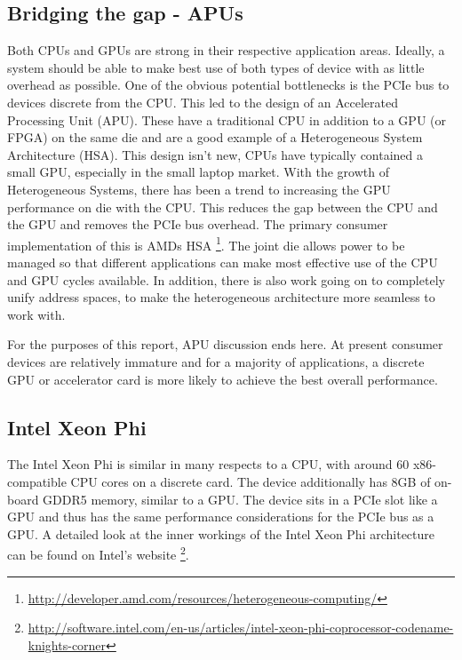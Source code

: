 \subsection{Bridging the gap - APUs}

Both CPUs and GPUs are strong in their respective application areas. Ideally, a
system should be able to make best use of both types of device with as little
overhead as possible. One of the obvious potential bottlenecks is the PCIe bus
to devices discrete from the CPU. This led to the design of an Accelerated
Processing Unit (APU). These have a traditional CPU in addition to a GPU (or
FPGA) on the same die and are a good example of a Heterogeneous System
Architecture (HSA). This design isn't new, CPUs have typically contained a small
GPU, especially in the small laptop market. With the growth of Heterogeneous
Systems, there has been a trend to increasing the GPU performance on die with
the CPU. This reduces the gap between the CPU and the GPU and removes the PCIe
bus overhead. The primary consumer implementation of this is AMDs HSA
\footnote{\url{http://developer.amd.com/resources/heterogeneous-computing/}}.
The joint die allows power to be managed so that different applications can make
most effective use of the CPU and GPU cycles available. In addition, there is
also work going on to completely unify address spaces, to make the heterogeneous
architecture more seamless to work with.

For the purposes of this report, APU discussion ends here. At present consumer
devices are relatively immature and for a majority of applications, a discrete
GPU or accelerator card is more likely to achieve the best overall performance.

\subsection{Intel Xeon Phi}

The Intel Xeon Phi is similar in many respects to a CPU, with around 60
x86-compatible CPU cores on a discrete card. The device additionally has 8GB of
on-board GDDR5 memory, similar to a GPU. The device sits in a PCIe slot like a
GPU and thus has the same performance considerations for the PCIe bus as a GPU.
A detailed look at the inner workings of the Intel Xeon Phi architecture can be
found on Intel's website
\footnote{\url{http://software.intel.com/en-us/articles/intel-xeon-phi-coprocessor-codename-knights-corner}}.


